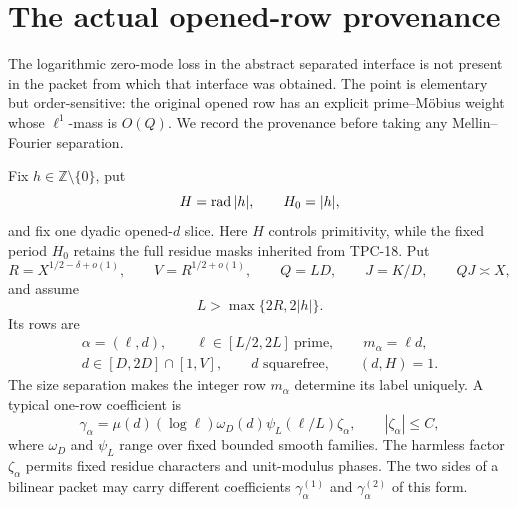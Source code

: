 \section{The actual opened-row provenance}
\label{sec:tpc25-provenance}

The logarithmic zero-mode loss in the abstract separated interface is
not present in the packet from which that interface was obtained.  The
point is elementary but order-sensitive: the original opened row has
an explicit prime--M\"obius weight whose \(\ell^1\)-mass is \(O(Q)\).
We record the provenance before taking any Mellin--Fourier separation.

Fix \(h\in\mathbb Z\setminus\{0\}\), put
\begin{equation}
 H=\operatorname{rad}|h|,\qquad H_0=|h|,
 \label{eq:tpc25-two-fixed-periods}
\end{equation}
and fix one dyadic opened-\(d\) slice.  Here \(H\) controls
primitivity, while the fixed period \(H_0\) retains the full residue
masks inherited from TPC-18.  Put
\begin{equation}
 R=X^{1/2-\delta+o(1)},\qquad V=R^{1/2+o(1)},
 \qquad Q=LD,\qquad J=K/D,\qquad QJ\asymp X,
 \label{eq:tpc25-row-scales}
\end{equation}
and assume
\begin{equation}
 L>\max\{2R,2|h|\}.
 \label{eq:tpc25-large-prime-separation}
\end{equation}
Its rows are
\begin{equation}
 \begin{gathered}
 \alpha=(\ell,d),\qquad
 \ell\in[L/2,2L]\ \text{prime},\qquad m_\alpha=\ell d,\\
 d\in[D,2D]\cap[1,V],\qquad
 d\text{ squarefree},\qquad(d,H)=1.
 \end{gathered}
 \label{eq:tpc25-row-family}
\end{equation}
The size separation makes the integer row \(m_\alpha\) determine its
label uniquely.  A typical one-row coefficient is
\begin{equation}
 \gamma_\alpha
 =\mu(d)(\log\ell)\omega_D(d)\psi_L(\ell/L)\zeta_\alpha,
 \qquad |\zeta_\alpha|\le C,
 \label{eq:tpc25-row-coefficient}
\end{equation}
where \(\omega_D\) and \(\psi_L\) range over fixed bounded smooth
families.  The harmless factor \(\zeta_\alpha\) permits fixed residue
characters and unit-modulus phases.  The two sides of a bilinear packet
may carry different coefficients \(\gamma_\alpha^{(1)}\) and
\(\gamma_\alpha^{(2)}\) of this form.

